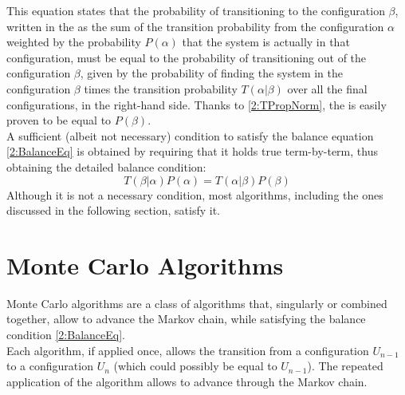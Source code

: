This equation states that the probability of transitioning to the configuration $\beta$, written in the \lhs as the sum of the transition probability from the configuration $\alpha$ weighted by the probability $P(\alpha)$ that the system is actually in that configuration, must be equal to the probability of transitioning out of the configuration $\beta$, given by the probability of finding the system in the configuration $\beta$ times the transition probability $T(\alpha|\beta)$ over all the final configurations, in the right-hand side.
Thanks to \eqref{2:TPropNorm}, the \rhs is easily proven to be equal to $P(\beta)$.\\
A sufficient (albeit not necessary) condition to satisfy the balance equation \eqref{2:BalanceEq} is obtained by requiring that it holds true term-by-term, thus obtaining the detailed balance condition:
\begin{equation}
    T(\beta|\alpha)P(\alpha) = T(\alpha|\beta)P(\beta) \label{2:DetailedBalance}
\end{equation}
Although it is not a necessary condition, most algorithms, including the ones discussed in the following section, satisfy it.

\section{Monte Carlo Algorithms}
Monte Carlo algorithms are a class of algorithms that, singularly or combined together, allow to advance the Markov chain, while satisfying the balance condition \eqref{2:BalanceEq}.\\
Each algorithm, if applied once, allows the transition from a configuration $U_{n-1}$ to a configuration $U_n$ (which could possibly be equal to $U_{n-1}$). The repeated application of the algorithm allows to advance through the Markov chain.


